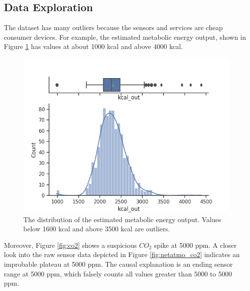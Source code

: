 \documentclass[conference]{IEEEtran}
\begin{document}
\subsection{Data Exploration}
The dataset has many outliers because the sensors and services are cheap consumer devices.
For example, the estimated metabolic energy output, shown in Figure \ref{fig:kcal_out} has values at about 1000 kcal and above 4000 kcal.


\begin{figure}[htbp]
\begin{center}
\includegraphics[width=1\linewidth]{figs/kcal_out.png}
\caption{The distribution of the estimated metabolic energy output. Values below 1600 kcal and above 3500 kcal are outliers.}
\label{fig:kcal_out}
\end{center}
\end{figure}

Moreover, Figure \ref{fig:co2} shows a suspicious $CO_2$ spike at 5000 ppm. A closer look into the raw sensor data depicted in Figure \ref{fig:netatmo_co2} indicates an improbable plateau at 5000 ppm. The causal explanation is an ending sensor range at 5000 ppm, which falsely counts all values greater than 5000 to 5000 ppm.
\end{document}
